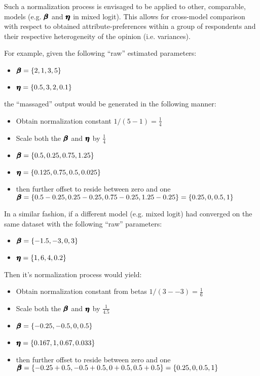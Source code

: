 \documentclass[12pt,a4paper]{article}
\begin{document}
Such a normalization process is envisaged to be applied to other, comparable, models (e.g. \( \pmb{\hm{\beta}} \) and \( \pmb{\hm{\eta}} \) in mixed logit). This allows for cross-model comparison with respect to obtained attribute-preferences within a group of respondents and their respective heterogeneity of the opinion (i.e. variances).

For example, given the following ``raw'' estimated parameters:

\begin{itemize}
\item \(\pmb{\hm{\beta}} = \{2, 1, 3, 5\}\)
\item \(\pmb{\hm{\eta}} = \{0.5, 3, 2, 0.1\}\)
\end{itemize}

the ``massaged'' output would be generated in the following manner:

\begin{itemize}
\item Obtain normalization constant \(1 / (5 - 1) =\frac{1}{4}\)
\item Scale both the \( \pmb{\hm{\beta}} \) and \( \pmb{\hm{\eta}} \) by \(\frac{1}{4}\)
\item \(\pmb{\hm{\beta}} = \{0.5, 0.25, 0.75, 1.25\}\)
\item \(\pmb{\hm{\eta}} = \{0.125, 0.75, 0.5, 0.025\}\)
\item then further offset to reside between zero and one \(\pmb{\hm{\beta}} = \{0.5 - 0.25, 0.25 - 0.25, 0.75 - 0.25, 1.25 - 0.25\} = \{0.25, 0, 0.5, 1\}\)
\end{itemize}

In a similar fashion, if a different model (e.g. mixed logit) had converged on the same dataset with the following ``raw'' parameters:

\begin{itemize}
\item \(\pmb{\hm{\beta}} = \{-1.5, -3, 0, 3\}\)
\item \(\pmb{\hm{\eta}} = \{1, 6, 4, 0.2\}\)
\end{itemize}

Then it's normalization process would yield:
\begin{itemize}
\item Obtain normalization constant from betas \(1 / (3 - -3) = \frac{1}{6}\)
\item Scale both the \( \pmb{\hm{\beta}} \) and \( \pmb{\hm{\eta}} \) by \(\frac{1}{4.5}\)
\item \(\pmb{\hm{\beta}} = \{-0.25, -0.5, 0, 0.5\}\)
\item \(\pmb{\hm{\eta}} = \{0.167, 1, 0.67, 0.033\}\)
\item then further offset to reside between zero and one \(\pmb{\hm{\beta}} = \{-0.25 + 0.5, -0.5 + 0.5, 0 + 0.5, 0.5 + 0.5\} = \{0.25, 0, 0.5, 1\}\)
\end{itemize}
\end{document}
